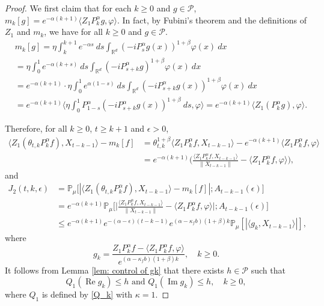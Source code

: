 \documentclass[12pt,a4paper]{amsart}
\theoremstyle{plain}
\theoremstyle{definition}
\numberwithin{equation}{section}
\begin{document}
\begin{proof}
We first claim that for each $k\geq0$ and $g\in \mathcal P$, $m_k[g]=e^{-\alpha(k+1)}\langle Z_1P_k^{\alpha}g, \varphi \rangle$. 
In fact, by Fubini's theorem and the definitions of $Z_1$ and $m_k$, we have for all $k\geq 0$ and $g\in \mathcal P$.
\begin{align}
	& m_k[g]
   = \eta \int_k^{k+1}e^{-\alpha s}~ds\int_{\mathbb R^d} (-iP_{s}^\alpha g(x))^{1+\beta} \varphi(x)~dx\\
  & = \eta \int_0^1e^{-\alpha (k+s)}~ds\int_{\mathbb R^d} (-iP_{s+k}^\alpha g)^{1+\beta}\varphi(x)~dx\\
  & = e^{-\alpha(k+1)} \cdot \eta \int_0^{1}e^{\alpha(1- s)}~ds\int_{\mathbb R^d} (-iP_{s+k}^\alpha        g(x))^{1+\beta} \varphi(x)~dx\\
  & =e^{-\alpha(k+1)}\langle \eta \int_0^1P_{1-s}^{\alpha}(-iP_{s+k}^\alpha g(x))^{1+\beta}~ds, \varphi \rangle
  =e^{-\alpha(k+1)}\langle Z_1(P_k^{\alpha}g), \varphi \rangle.
\end{align}

Therefore, for all $k\geq 0$, $t\geq k+1$ and $\epsilon> 0$,
\begin{align}
  \langle Z_1(\theta_{t,k}P^\alpha_k f),X_{t-k-1}\rangle-m_k[f]
    & = \theta_{t,k}^{1+\beta} \langle Z_1P^\alpha_k f,X_{t-k-1}\rangle - e^{-\alpha (k+1)}\langle  Z_1P^\alpha_k f,\varphi\rangle
  \\ & =e^{-\alpha (k+1)}\Big(\frac{\langle Z_1P^\alpha_k f ,X_{t-k-1}\rangle}{\|X_{t-k-1}\|}-\langle  Z_1P^\alpha_k f ,\varphi\rangle\Big),
\end{align}
and
\begin{align}
  \label{eq: prevJ2}
  J_2(t,k,\epsilon)
  & = \mathbb P_\mu\big[|\langle Z_1(\theta_{t,k}P^\alpha_k f),X_{t-k-1}\rangle-m_k[f]|;A_{t-k-1}(\epsilon)\big] \\ 
  & =e^{-\alpha( k+1)}\mathbb{P}_{\mu}\bigg[\Big|\frac{\langle Z_1P^{\alpha}_k f,X_{t-k-1}\rangle}{\|X_{t-k-1}\|}-\langle  Z_1P^{\alpha}_k f,\varphi\rangle\Big|;A_{t-k-1}(\epsilon)\bigg]\nonumber\\
  & \leq e^{-\alpha (k+1)}e^{-(\alpha-\epsilon)(t-k-1)}e^{(\alpha-\kappa_f b)(1+\beta)k} \mathbb{P}_{\mu}\left[\left|\langle g_k,X_{t-k-1}\rangle\right|\right],
\end{align}
where
\[
  g_k
  = \frac{Z_1 P^{\alpha}_k f-\langle  Z_1P^{\alpha}_k f,\varphi\rangle}{e^{(\alpha-\kappa_f b)(1+\beta)k}},
  \quad k \geq 0.
\]
It follows from Lemma \ref{lem: control of gk} that there exists $h\in \mathcal{P}$ such that
\[
  Q_1 (\operatorname{Re} g_k) \leq h
  \text{ and } Q_1 (\operatorname{Im} g_k)\leq h,
  \quad k \geq 0,
\]
where $Q_1$ is defined by \eqref{Q_k} with $\kappa=1$.


\end{proof}
\end{document}
